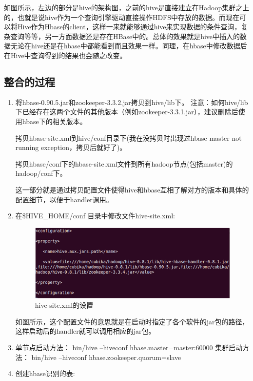   如图所示，左边的部分是hive的架构图，之前的hive是直接建立在Hadoop集群之上的，也就是说hive作为一个查询引擎驱动直接操作HDFS中存放的数据。而现在可以将Hive作为Hbase的client，这样一来就能够通过hive来实现数据的条件查询，复杂查询等等，另一方面数据还是存在HBase中的。总体的效果就是hive中插入的数据无论在hive还是在hbase中都能看到而且效果一样。同理，在hbase中修改数据后在Hive中查询得到的结果也会随之改变。

\subsection{整合的过程}
\begin{enumerate}
\item 将hbase-0.90.5.jar和zookeeper-3.3.2.jar拷贝到hive/lib下。
注意：如何hive/lib下已经存在这两个文件的其他版本（例如zookeeper-3.3.1.jar），建议删除后使用hbase下的相关版本。


拷贝hbase-site.xml到hive/conf目录下(我在没拷贝时出现过hbase master not running exception，拷贝后就好了)。

拷贝hbase/conf下的hbase-site.xml文件到所有hadoop节点(包括master)的hadoop/conf下。

这一部分就是通过拷贝配置文件使得hive和hbase互相了解对方的版本和具体的配置细节，以便于handler调用。

\item 在\$HIVE\_HOME/conf 目录中修改文件hive-site.xml:

\begin{figure}[!ht]
\centering
\includegraphics[]{photo/hive-site.PNG} 
\caption{hive-site.xml的设置}
\end{figure} 

如图所示，这个配置文件的意思就是在启动时指定了各个软件的jar包的路径，这样启动后的handler就可以调用相应的jar包。

\item 单节点启动方法：
bin/hive –hiveconf hbase.master=master:60000
集群启动方法：
bin/hive –hiveconf hbase.zookeeper.quorum=slave


\item  创建hbase识别的表:


\end{enumerate}
